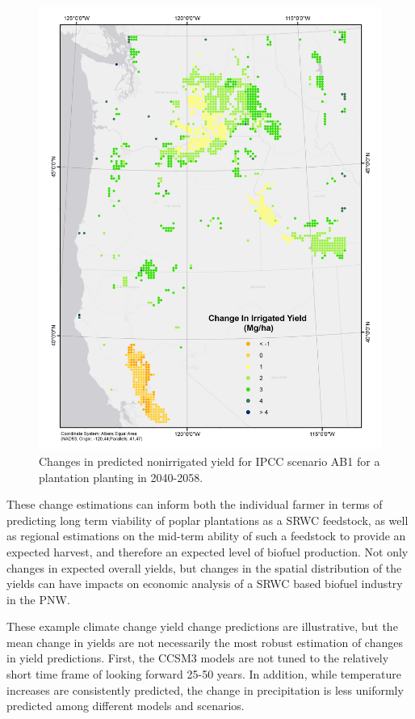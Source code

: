 \documentclass[preprint,12pt]{elsarticle}
\begin{document}
\begin{figure}[hp]
  \centering
  \includegraphics[width=1\linewidth]{climate_irrigated}
  \caption{Changes in predicted nonirrigated yield for \ac{IPCC} scenario \ac{AB1}
    for a plantation planting in 2040-2058.}
  \label{fig:new_nonirrigated}
\end{figure}

These change estimations can inform both the individual farmer in terms of
predicting long term viability of poplar plantations as a \ac{SRWC}
feedstock, as well as regional estimations on the mid-term ability of
such a feedstock to provide an expected harvest, and therefore an
expected level of biofuel production.  Not only changes in expected
overall yields, but changes in the spatial distribution of the yields
can have impacts on economic analysis of a \ac{SRWC} based biofuel
industry in the \ac{PNW}.  

These example climate change yield change predictions are
illustrative, but the mean change in yields are not necessarily the
most robust estimation of changes in yield predictions.  First, the
\ac{CCSM3} models are not tuned to the relatively short time frame of
looking forward 25-50 years.  In addition, while temperature increases
are consistently predicted, the change in precipitation is less
uniformly predicted among different models and scenarios. 
\end{document}
